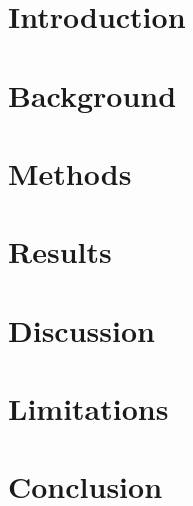 \documentclass[sigconf]{acmart}
\begin{document}
\maketitle

\section{Introduction}



\section{Background}




\section{Methods}



\section{Results}



\section{Discussion}



\section{Limitations}



\section{Conclusion}





\balance

\end{document}

